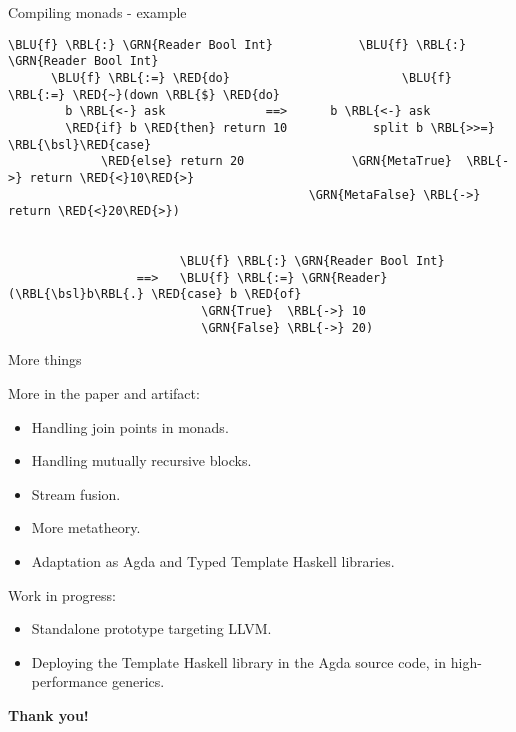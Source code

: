 \documentclass[dvipsnames,aspectratio=169]{beamer}
\theoremstyle{remark}
\newcommand{\RED}[1]{{\color{BrickRed} #1}}
\newcommand{\GRN}[1]{{\color{OliveGreen} #1}}
\newcommand{\RBL}[1]{{\color{RoyalBlue} #1}}
\newcommand{\BLU}[1]{{\color{Blue} #1}}
\newcommand{\bsl}{\textbackslash}
\begin{document}
\begin{frame}[fragile]{Compiling monads - example}

\begin{Verbatim}[commandchars=\\\{\}]
      \BLU{f} \RBL{:} \GRN{Reader Bool Int}            \BLU{f} \RBL{:} \GRN{Reader Bool Int}
      \BLU{f} \RBL{:=} \RED{do}                        \BLU{f} \RBL{:=} \RED{~}(down \RBL{$} \RED{do}
        b \RBL{<-} ask              ==>      b \RBL{<-} ask
        \RED{if} b \RED{then} return 10            split b \RBL{>>=} \RBL{\bsl}\RED{case}
             \RED{else} return 20               \GRN{MetaTrue}  \RBL{->} return \RED{<}10\RED{>}
                                          \GRN{MetaFalse} \RBL{->} return \RED{<}20\RED{>})


                        \BLU{f} \RBL{:} \GRN{Reader Bool Int}
                  ==>   \BLU{f} \RBL{:=} \GRN{Reader} (\RBL{\bsl}b\RBL{.} \RED{case} b \RED{of}
                           \GRN{True}  \RBL{->} 10
                           \GRN{False} \RBL{->} 20)
\end{Verbatim}


\end{frame}




\begin{frame}{More things}

More in the paper and artifact:
\begin{itemize}
  \item Handling join points in monads.
  \item Handling mutually recursive blocks.
  \item Stream fusion.
  \item More metatheory.
  \item Adaptation as Agda and Typed Template Haskell libraries.
\end{itemize}
\vspace{1em}

Work in progress:
\begin{itemize}
\item Standalone prototype targeting LLVM.
\item Deploying the Template Haskell library in the Agda source code,
      in high-performance generics.
\end{itemize}

\pause
\begin{center}

  \Large{\textbf{Thank you!}}

\end{center}
\end{frame}
\end{document}
